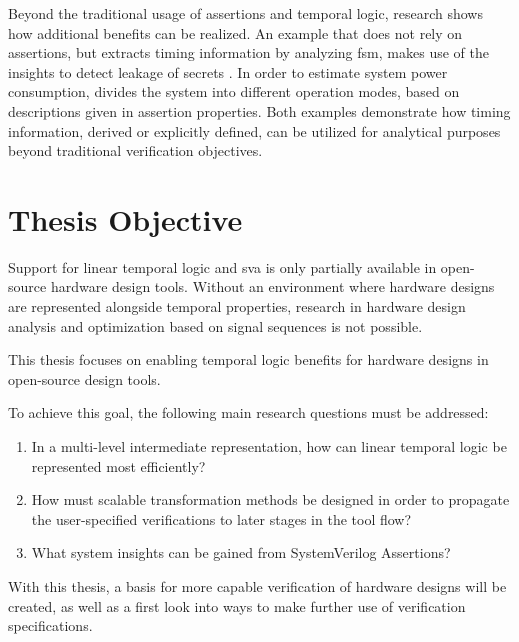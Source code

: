 \documentclass[11pt,DIV=16,parskip=half]{scrartcl}
\begin{document}
Beyond the traditional usage of assertions and temporal logic, research shows
how additional benefits can be realized.
An example that does not rely on assertions, but extracts timing information
by analyzing \gls{fsm}, makes use of the insights to detect leakage
of secrets \cite{reimannQTFlowQuantitativeTimingSensitive2024}.
In order to estimate system power consumption,
\cite{ahujaAssertionBasedModalPower2007} divides the system into different
operation modes, based on descriptions given in assertion properties.
Both examples demonstrate how timing information, derived or explicitly
defined, can be utilized for analytical purposes beyond traditional
verification objectives.

\section{Thesis Objective}


Support for linear temporal logic and \gls{sva} is only partially available
in open-source hardware design tools.
Without an environment where hardware designs are represented alongside
temporal properties, research in hardware design analysis and optimization
based on signal sequences is not possible.

This thesis focuses on enabling temporal logic benefits for hardware designs in
open-source design tools.

To achieve this goal, the following main research questions must be addressed:

\begin{enumerate}
  \item In a multi-level intermediate representation, how can linear temporal
    logic be represented most efficiently?
  \item How must scalable transformation methods be designed in order to
    propagate the user-specified verifications to later stages in the tool
    flow?
  \item What system insights can be gained from SystemVerilog Assertions?
\end{enumerate}

With this thesis, a basis for more capable verification of hardware designs
will be created, as well as a first look into ways to make further use of
verification specifications.
\end{document}
